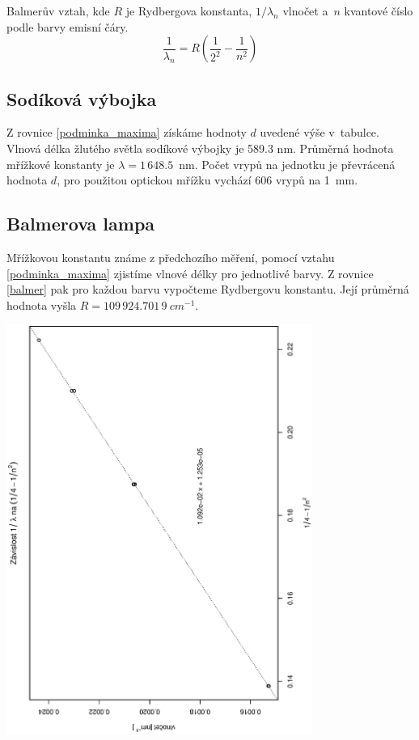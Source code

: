 \documentclass[10pt]{article}
\begin{document}
Balmerův vztah, kde $R$ je Rydbergova konstanta, $1/\lambda_n$ vlnočet
a~$n$ kvantové číslo podle barvy emisní čáry.
\begin{equation}
\frac{1}{\lambda_n} = R \left(\frac{1}{2^2} - \frac{1}{n^2}\right)
\label{balmer}
\end{equation}

\subsection{Sodíková výbojka}
Z rovnice \eqref{podminka_maxima} získáme hodnoty $d$ uvedené výše 
v~tabulce. Vlnová délka žlutého světla sodíkové výbojky je 589.3 nm.
Průměrná hodnota mřížkové konstanty je $\lambda = 1\,648.5$~nm.
Počet vrypů na jednotku je převrácená hodnota $d$, pro použitou optickou
mřížku vychází 606 vrypů na 1~mm.

\subsection{Balmerova lampa}
Mřížkovou konstantu známe z předchozího měření, pomocí vztahu 
\eqref{podminka_maxima} zjistíme vlnové délky pro jednotlivé barvy.
Z rovnice \eqref{balmer} pak pro každou barvu vypočteme 
Rydbergovu konstantu. Její průměrná hodnota vyšla $R = 109\,924.701\,9~cm^{-1}$.

\begin{center}
\includegraphics[width=10cm,angle=270]{lab1.eps}
\end{center}
\end{document}
